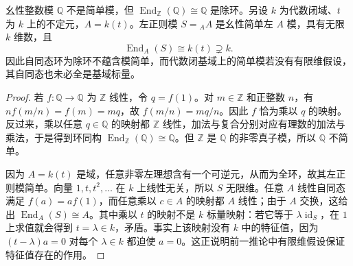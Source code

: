 \begin{proposition}\label{b2:prop:schur-hypothesis-counterexamples}
	幺性整数模 \(\mathbb Q\) 不是简单模，但 \(\operatorname{End}_{\mathbb Z}(\mathbb Q)\cong\mathbb Q\) 是除环。另设 \(k\) 为代数闭域、\(t\) 为 \(k\) 上的不定元，\(A=k(t)\)。左正则模 \(S={}_AA\) 是幺性简单左 \(A\) 模，具有无限 \(k\) 维数，且
	\[
		\operatorname{End}_A(S)\cong k(t)\supsetneq k.
	\]
	因此自同态环为除环不蕴含模简单，而代数闭基域上的简单模若没有有限维假设，其自同态也未必全是基域标量。
\end{proposition}
\begin{proof}
	若 \(f:\mathbb Q\to\mathbb Q\) 为 \(\mathbb Z\) 线性，令 \(q=f(1)\)。对 \(m\in\mathbb Z\) 和正整数 \(n\)，有 \(nf(m/n)=f(m)=mq\)，故 \(f(m/n)=mq/n\)。因此 \(f\) 恰为乘以 \(q\) 的映射。反过来，乘以任意 \(q\in\mathbb Q\) 的映射都 \(\mathbb Z\) 线性，加法与复合分别对应有理数的加法与乘法，于是得到环同构 \(\operatorname{End}_{\mathbb Z}(\mathbb Q)\cong\mathbb Q\)。但 \(\mathbb Z\) 是 \(\mathbb Q\) 的非零真子模，所以 \(\mathbb Q\) 不简单。

	因为 \(A=k(t)\) 是域，任意非零左理想含有一个可逆元，从而为全环，故其左正则模简单。向量 \(1,t,t^2,\ldots\) 在 \(k\) 上线性无关，所以 \(S\) 无限维。任意 \(A\) 线性自同态满足 \(f(a)=af(1)\)，而任意乘以 \(c\in A\) 的映射都 \(A\) 线性；由于 \(A\) 交换，这给出 \(\operatorname{End}_A(S)\cong A\)。其中乘以 \(t\) 的映射不是 \(k\) 标量映射：若它等于 \(\lambda\operatorname{id}_S\)，在 \(1\) 上求值就会得到 \(t=\lambda\in k\)，矛盾。事实上该映射没有 \(k\) 中的特征值，因为 \((t-\lambda)a=0\) 对每个 \(\lambda\in k\) 都迫使 \(a=0\)。这正说明前一推论中有限维假设保证特征值存在的作用。
\end{proof}
